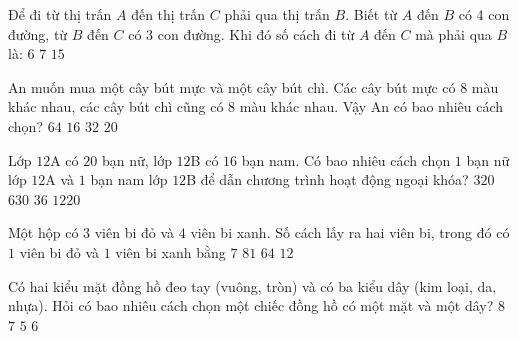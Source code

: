 \begin{ex}%
	Để đi từ thị trấn $A$ đến thị trấn $C$ phải qua thị trấn $B$. Biết từ $A$ đến $B$ có 4 con đường, từ $B$ đến $C$ có 3 con đường. Khi đó số cách đi từ $A$ đến $C$ mà phải qua $B$ là:
	\choice
	{$6$}
	{$7$}
	{$15$}
	{}
\end{ex}

\begin{ex}%
	An muốn mua một cây bút mực và một cây bút chì. Các cây bút mực có $8$ màu khác nhau, các cây bút chì cũng có $8$ màu khác nhau. Vậy An có bao nhiêu cách chọn?
	\choice
	{\True $64$}
	{$16$}
	{$32$}
	{$20$}
\end{ex}

\begin{ex}%
	Lớp $12$A có $20$ bạn nữ, lớp $12$B có $16$ bạn nam. Có bao nhiêu cách chọn $1$ bạn nữ lớp $12$A và $1$ bạn nam lớp $12$B để dẫn chương trình hoạt động ngoại khóa?
	\choice
	{\True $320$}
	{$630$}
	{$36$}
	{$1220$}
\end{ex}

\begin{ex}%
	Một hộp có $3$ viên bi đỏ và $4$ viên bi xanh. Số cách lấy ra hai viên bi, trong đó có $1$ viên bi đỏ và $1$ viên bi xanh bằng
	\choice
	{$7$}
	{$81$}
	{$64$}
	{\True $12$}
\end{ex}

\begin{ex}%
	Có hai kiểu mặt đồng hồ đeo tay (vuông, tròn) và có ba kiểu dây (kim loại, da, nhựa). Hỏi có bao nhiêu cách chọn một chiếc đồng hồ có một mặt và một dây?
	\choice
	{$8$}
	{$7$}
	{$5$}
	{\True $6$}
\end{ex}

